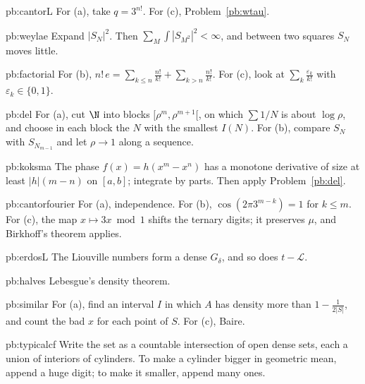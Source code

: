 \begin{hint}{pb:cantorL}
For (a), take $q=3^{n!}$. For (c), Problem~\ref{pb:wtau}.
\end{hint}

\begin{hint}{pb:weylae}
Expand $|S_N|^2$. Then $\sum_M\int|S_{M^2}|^2<\infty$, and between two squares $S_N$ moves little.
\end{hint}

\begin{hint}{pb:factorial}
For (b), $n!\,e=\sum_{k\le n}\frac{n!}{k!}+\sum_{k>n}\frac{n!}{k!}$. For (c), look at $\sum_k\frac{\varepsilon_k}{k!}$ with $\varepsilon_k\in\{0,1\}$.
\end{hint}

\begin{hint}{pb:del}
For (a), cut $\N$ into blocks $[\rho^m,\rho^{m+1}[$, on which $\sum1/N$ is about $\log\rho$, and choose in each block the $N$ with the smallest $I(N)$. For (b),
compare $S_N$ with $S_{N_{m-1}}$ and let $\rho\to1$ along a sequence.
\end{hint}

\begin{hint}{pb:koksma}
The phase $f(x)=h(x^m-x^n)$ has a monotone derivative of size at least $|h|(m-n)$ on $[a,b]$; integrate by parts. Then apply Problem~\ref{pb:del}.
\end{hint}

\begin{hint}{pb:cantorfourier}
For (a), independence. For (b), $\cos(2\pi3^{m-k})=1$ for $k\le m$. For (c), the map $x\mapsto3x\bmod1$ shifts the ternary digits; it preserves $\mu$, and
Birkhoff's theorem applies.
\end{hint}

\begin{hint}{pb:erdosL}
The Liouville numbers form a dense $G_\delta$, and so does $t-\mathcal L$.
\end{hint}

\begin{hint}{pb:halves}
Lebesgue's density theorem.
\end{hint}

\begin{hint}{pb:similar}
For (a), find an interval $I$ in which $A$ has density more than $1-\frac1{2|S|}$, and count the bad $x$ for each point of $S$. For (c), Baire.
\end{hint}

\begin{hint}{pb:typicalcf}
Write the set as a countable intersection of open dense sets, each a union of interiors of cylinders. To make a cylinder bigger in geometric mean, append a
huge digit; to make it smaller, append many ones.
\end{hint}

